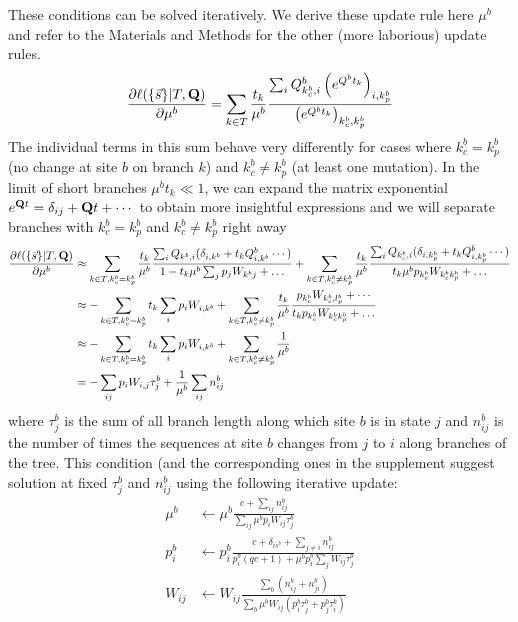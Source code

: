 \documentclass[aps,rmp,twocolumn]{revtex4}
\newcommand{\mat}[1]{{\bf #1}}
\newcommand{\eqp}{p}
\newcommand{\pc}{c}
\begin{document}
These conditions can be solved iteratively. We derive these update rule here $\mu^b$ and refer to the Materials and Methods for the other (more laborious) update rules.
\begin{equation}
	\frac{\partial \ell(\{\vec{s}\}|T,\mat{Q})}{\partial \mu^b} = \sum_{k\in T} \frac{t_k}{\mu^b}\frac{\sum_i Q^b_{k^b_c,i}\left( e^{Q^bt_k} \right)_{i, k^b_p}}{\left( e^{Q^bt_k} \right)_{k^b_c, k^b_p}}
\end{equation}
The individual terms in this sum behave very differently for cases where $k^b_c=k^b_p$ (no change at site $b$ on branch $k$) and $k^b_c\neq k^b_p$ (at least one mutation).
In the limit of short branches $\mu^b t_k\ll 1$, we can expand the matrix exponential $e^{\mat{Q}t}=\delta_{ij} + \mat{Q}t+\cdots$ to obtain more insightful expressions and we will separate branches with $k^b_c=k^b_p$  and $k^b_c\neq k^b_p$ right away
\begin{equation}
\begin{split}
	\frac{\partial \ell(\{\vec{s}\}|T,\mat{Q})}{\partial \mu^b} &\approx \sum_{k\in T, k^b_c=k^b_p} \frac{t_k}{\mu^b}\frac{\sum_i Q_{k^b,i}(\delta_{i,k^b} + t_k Q^b_{i,k^b}\cdots)}{1 - t_k\mu^b\sum_{j}\eqp_j W_{k^bj}+\ldots} +
	\sum_{k\in T, k^b_c\neq k^b_p} \frac{t_k}{\mu^b}\frac{\sum_i Q_{k^b_c,i}(\delta_{i,k^b_p} + t_k Q^b_{i,k^b_p}\cdots)}{t_k\mu^b\eqp_{k^b_c} W_{k^b_ck^b_p}+\ldots} \\
		&\approx -\sum_{k\in T, k^b_c=k^b_p}t_k \sum_i \eqp_{i}W_{i,k^b} +
	\sum_{k\in T, k^b_c\neq k^b_p} \frac{t_k}{\mu^b}\frac{p_{k^b_c}W_{k^b_c, l^b_p} + \cdots}{t_k\eqp_{k^b_c} W_{k^b_ck^b_p}+\ldots} \\
		&\approx -\sum_{k\in T, k^b_c=k^b_p}t_k \sum_i \eqp_{i}W_{i,k^b} + 	\sum_{k\in T, k^b_c\neq k^b_p} \frac{1}{\mu^b} \\
		&= -\sum_{ij}\eqp_{i}W_{i,j}\tau_j^b + \frac{1}{\mu^b}\sum_{ij} n^b_{ij}
	\end{split}
\end{equation}
where $\tau^b_j$ is the sum of all branch length along which site $b$ is in state $j$ and $n^b_{ij}$ is the number of times the sequences at site $b$ changes from $j$ to $i$ along branches of the tree.
This condition (and the corresponding ones in the supplement suggest solution at fixed $\tau^b_j$ and $n^b_{ij}$ using the following iterative update:
\begin{equation}
\label{eq:update_app}
	\begin{split}
		\mu^b & \leftarrow \mu^b\frac{\pc+\sum_{ij} n^b_{ij}}{\sum_{ij}\mu^b \eqp_{i}W_{ij}\tau_j^b} \\
		\eqp^b_i & \leftarrow \eqp^b_i\frac{\pc+\delta_{is^{b}} + \sum_{j\neq i} n^b_{ij}}{\eqp^b_i(q\pc+1) + \mu^b\eqp^b_i \sum_{j}W_{ij}\tau_j^b} \\
		W_{ij} & \leftarrow W_{ij}\frac{\sum_b (n^b_{ij}+n^b_{ji})}{\sum_b \mu^b W_{ij}(\eqp_i^b\tau_j^b + \eqp_j^b \tau_i^b)} \\
	\end{split}
\end{equation}
\end{document}
